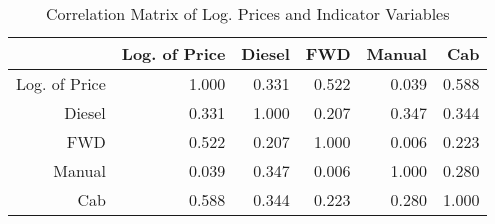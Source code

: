 \begin{table}[ht]
\centering
\begin{tabular}{rrrrrr}
  \hline
 & Log. of Price & Diesel & FWD & Manual & Cab \\ 
  \hline
Log. of Price & 1.000 & 0.331 & 0.522 & 0.039 & 0.588 \\ 
  Diesel & 0.331 & 1.000 & 0.207 & 0.347 & 0.344 \\ 
  FWD & 0.522 & 0.207 & 1.000 & 0.006 & 0.223 \\ 
  Manual & 0.039 & 0.347 & 0.006 & 1.000 & 0.280 \\ 
  Cab & 0.588 & 0.344 & 0.223 & 0.280 & 1.000 \\ 
   \hline
\end{tabular}
\caption{Correlation Matrix of Log. Prices and Indicator Variables} 
\label{tab:correlation_ind}
\end{table}
